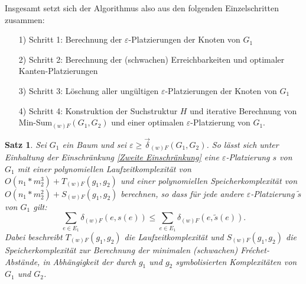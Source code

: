 \documentclass[a4paper, 12pt, twoside]{article}
\theoremstyle{Format1} %
\newtheorem{Satz}[Def]{Satz}                %
\begin{document}
Insgesamt setzt sich der Algorithmus also aus den folgenden Einzelschritten zusammen:
\begin{enumerate}
	\item[1)] Schritt 1: Berechnung der $\varepsilon$-Platzierungen der Knoten von $G_1$
	\item[2)] Schritt 2: Berechnung der (schwachen) Erreichbarkeiten und optimaler Kanten-Platzierungen
	\item[3)] Schritt 3: Löschung aller ungültigen $\varepsilon$-Platzierungen der Knoten von $G_1$
	\item[4)] Schritt 4: Konstruktion der Suchstruktur $H$ und iterative Berechnung von Min-Sum$_{(w)F}(G_1, G_2)$ und einer optimalen $\varepsilon$-Platzierung von $G_1$.
\end{enumerate}

\begin{Satz}
	Sei $G_1$ ein Baum und sei $\varepsilon \geq \vec{\delta}_{(w)F}(G_1,G_2)$.
	So lässt sich unter Einhaltung der Einschränkung \ref{Zweite Einschränkung} eine $\varepsilon$-Platzierung $s$ von $G_1$
	mit einer polynomiellen Laufzeitkomplexität von $O(n_1*m_2^3) + T_{(w)F}(g_1, g_2)$ und einer polynomiellen Speicherkomplexität von $O(n_1*m_2^2) + S_{(w)F}(g_1, g_2)$ berechnen, so dass für jede
	andere $\varepsilon$-Platzierung $\tilde{s}$ von $G_1$ gilt:
	$$\sum_{e \in E_1}\delta_{(w)F}(e, s(e)) \leq \sum_{e \in E_1}\delta_{(w)F}(e, \tilde{s}(e)).$$
	Dabei beschreibt $T_{(w)F}(g_1, g_2)$ die Laufzeitkomplexität und $S_{(w)F}(g_1, g_2)$ die Speicherkomplexität zur Berechnung der minimalen (schwachen) Fréchet-Abstände, in Abhängigkeit
	der durch $g_1$ und $g_2$ symbolisierten Komplexitäten von $G_1$ und $G_2$.
\end{Satz}
\end{document}
